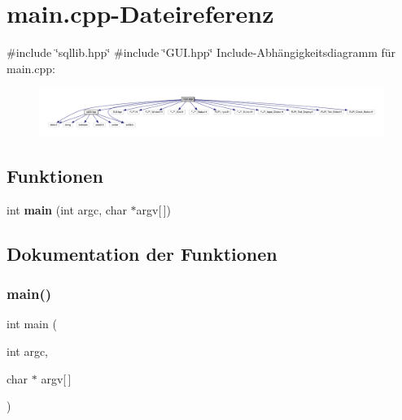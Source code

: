 \section{main.\+cpp-\/\+Dateireferenz}
\label{main_8cpp}
{\ttfamily \#include \char`\"{}sqllib.\+hpp\char`\"{}}\newline
{\ttfamily \#include \char`\"{}G\+U\+I.\+hpp\char`\"{}}\newline
Include-\/\+Abhängigkeitsdiagramm für main.\+cpp\+:
\nopagebreak
\begin{figure}[H]
\begin{center}
\leavevmode
\includegraphics[width=350pt]{main_8cpp__incl}
\end{center}
\end{figure}
\subsection*{Funktionen}
\begin{DoxyCompactItemize}
\item 
int \textbf{ main} (int argc, char $\ast$argv[$\,$])
\end{DoxyCompactItemize}


\subsection{Dokumentation der Funktionen}
\mbox{\label{main_8cpp_a0ddf1224851353fc92bfbff6f499fa97}} 
\subsubsection{main()}
{\footnotesize\ttfamily int main (\begin{DoxyParamCaption}\item[{int}]{argc,  }\item[{char $\ast$}]{argv[$\,$] }\end{DoxyParamCaption})}

